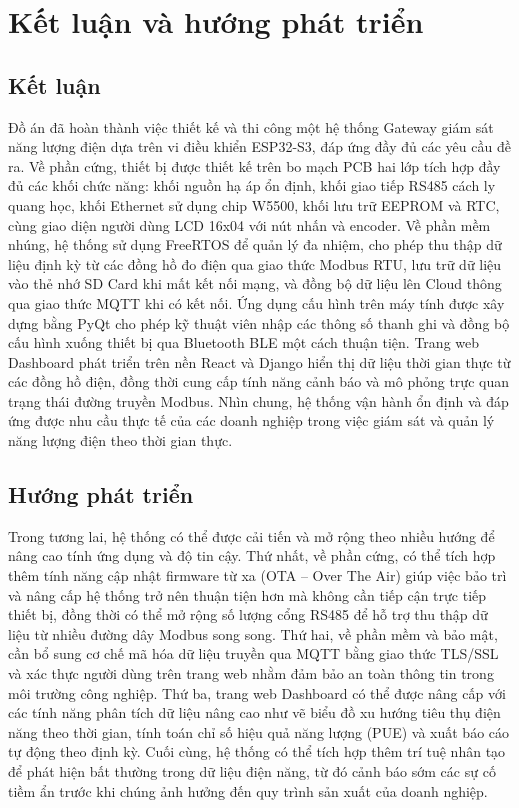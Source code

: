 \chapter{Kết luận và hướng phát triển}
\section{Kết luận}
Đồ án đã hoàn thành việc thiết kế và thi công một hệ thống Gateway giám sát năng lượng điện dựa trên vi điều 
khiển ESP32-S3, đáp ứng đầy đủ các yêu cầu đề ra. Về phần cứng, thiết bị được thiết kế trên bo mạch PCB hai 
lớp tích hợp đầy đủ các khối chức năng: khối nguồn hạ áp ổn định, khối giao tiếp RS485 cách ly quang học, 
khối Ethernet sử dụng chip W5500, khối lưu trữ EEPROM và RTC, cùng giao diện người dùng LCD 16x04 với nút 
nhấn và encoder. Về phần mềm nhúng, hệ thống sử dụng FreeRTOS để quản lý đa nhiệm, cho phép thu thập dữ liệu 
định kỳ từ các đồng hồ đo điện qua giao thức Modbus RTU, lưu trữ dữ liệu vào thẻ nhớ SD Card khi mất kết nối 
mạng, và đồng bộ dữ liệu lên Cloud thông qua giao thức MQTT khi có kết nối. Ứng dụng cấu hình trên máy tính 
được xây dựng bằng PyQt cho phép kỹ thuật viên nhập các thông số thanh ghi và đồng bộ cấu hình xuống thiết bị 
qua Bluetooth BLE một cách thuận tiện. Trang web Dashboard phát triển trên nền React và Django hiển thị dữ 
liệu thời gian thực từ các đồng hồ điện, đồng thời cung cấp tính năng cảnh báo và mô phỏng trực quan trạng 
thái đường truyền Modbus. Nhìn chung, hệ thống vận hành ổn định và đáp ứng được nhu cầu thực tế của các doanh 
nghiệp trong việc giám sát và quản lý năng lượng điện theo thời gian thực.
\section{Hướng phát triển}
Trong tương lai, hệ thống có thể được cải tiến và mở rộng theo nhiều hướng để nâng cao tính ứng dụng và độ tin 
cậy. Thứ nhất, về phần cứng, có thể tích hợp thêm tính năng cập nhật firmware từ xa (OTA – Over The Air) giúp 
việc bảo trì và nâng cấp hệ thống trở nên thuận tiện hơn mà không cần tiếp cận trực tiếp thiết bị, đồng thời 
có thể mở rộng số lượng cổng RS485 để hỗ trợ thu thập dữ liệu từ nhiều đường dây Modbus song song. Thứ hai, 
về phần mềm và bảo mật, cần bổ sung cơ chế mã hóa dữ liệu truyền qua MQTT bằng giao thức TLS/SSL và xác thực 
người dùng trên trang web nhằm đảm bảo an toàn thông tin trong môi trường công nghiệp. Thứ ba, trang web 
Dashboard có thể được nâng cấp với các tính năng phân tích dữ liệu nâng cao như vẽ biểu đồ xu hướng tiêu thụ 
điện năng theo thời gian, tính toán chỉ số hiệu quả năng lượng (PUE) và xuất báo cáo tự động theo định kỳ. 
Cuối cùng, hệ thống có thể tích hợp thêm trí tuệ nhân tạo để phát hiện bất thường trong dữ liệu điện năng, 
từ đó cảnh báo sớm các sự cố tiềm ẩn trước khi chúng ảnh hưởng đến quy trình sản xuất của doanh nghiệp.
